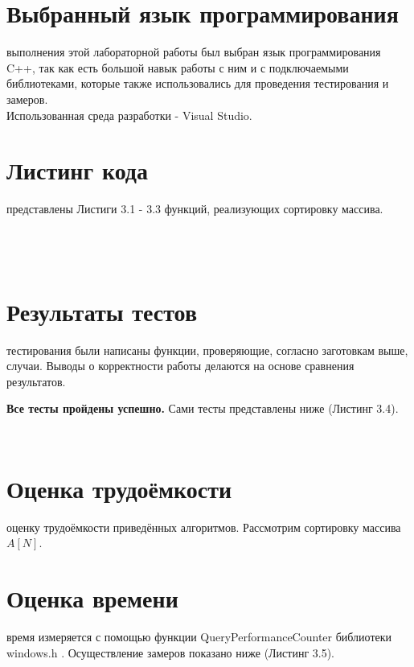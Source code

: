 \section{Выбранный язык программирования}
 выполнения этой лабораторной работы был выбран язык программирования C++, так как есть большой навык работы с ним и с подключаемыми библиотеками, которые также использовались для проведения тестирования и замеров.\\

Использованная среда разработки - Visual Studio.

\section{Листинг кода}
 представлены Листиги 3.1 - 3.3 функций, реализующих сортировку массива.
\begin{lstlisting}[label=code, caption = Сортировка пузырьком]

\end{lstlisting}

\begin{lstlisting}[label=code, caption = Сортировка вставками]
	
\end{lstlisting}

\begin{lstlisting}[label=code, caption = ****]

\end{lstlisting}

\section{Результаты тестов}
 тестирования были написаны функции, проверяющие, согласно заготовкам выше, случаи. Выводы о корректности работы делаются на основе сравнения результатов.

\textbf{Все тесты пройдены успешно.} Сами тесты представлены ниже (Листинг 3.4).\\

\begin{lstlisting}[label=code, caption = Тесты]
	
\end{lstlisting}

\section{Оценка трудоёмкости}
 оценку трудоёмкости приведённых алгоритмов. Рассмотрим сортировку массива  $A[N]$.\\

\section{Оценка времени}
 время измеряется с помощью функции QueryPerformanceCounter библиотеки windows.h \cite{Query}. Осуществление замеров показано ниже (Листинг 3.5).
\begin{lstlisting}[label=code, caption = Замеры процессорного времени]
	
\end{lstlisting}